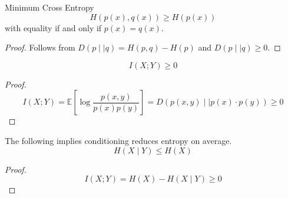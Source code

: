 \begin{cor}{Minimum Cross Entropy}{}
\[
    H(p(x),q(x)) \geq H(p(x))
\]
with equality if and only if \(p(x) = q(x)\). 
\tcbline
\begin{proof}
Follows from \(D(p\mid \mid q) = H(p,q) - H(p)\) and \(D(p\mid \mid q)\geq 0\).  
\end{proof}

\end{cor}
\begin{cor}{}{}
\[
    I(X;Y) \geq 0 
\]

\tcbline 
\begin{proof}
\[
    I(X;Y) = \mathbb{E} \left[ \log \frac{p(x,y)}{p(x)p(y)}  \right] = D(p(x,y)\mid \mid p(x)\cdot p(y)) \geq 0
\]
\end{proof}

\end{cor}

\begin{cor}{}{}

The following implies conditioning reduces entropy on average. 
\[
    H(X\mid Y) \leq H(X)
\]

\tcbline
\begin{proof}
\[
    I(X;Y) = H(X)- H(X\mid Y) \geq 0
\]
\end{proof}

\end{cor}